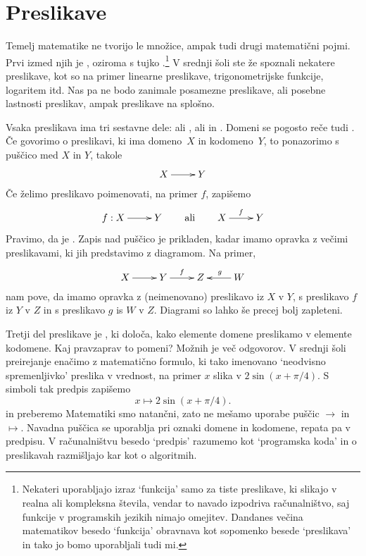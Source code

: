 \section{Preslikave}

Temelj matematike ne tvorijo le množice, ampak tudi drugi matematični pojmi. Prvi izmed
njih je , oziroma s tujko .\footnote{Nekateri uporabljajo
  izraz `funkcija' samo za tiste preslikave, ki slikajo v realna ali kompleksna števila,
  vendar to navado izpodriva računalništvo, saj funkcije v programskih jezikih nimajo
  omejitev. Dandanes večina matematikov besedo `funkcija' obravnava kot sopomenko besede
  `preslikava' in tako jo bomo uporabljali tudi mi.} V srednji šoli ste že spoznali
nekatere preslikave, kot so na primer linearne preslikave, trigonometrijske funkcije,
logaritem itd. Nas pa ne bodo zanimale posamezne preslikave, ali posebne lastnosti
preslikav, ampak preslikave na splošno.

Vsaka preslikava ima tri sestavne dele:  ali ,
 ali  in . Domeni se pogosto reče tudi
. Če govorimo o preslikavi, ki ima domeno~$X$ in kodomeno~$Y$, to
ponazorimo s puščico med $X$ in $Y$, takole
%
\begin{equation*}
  \xymatrix{
    {X} \ar[r] &
    {Y}
  }
\end{equation*}
%
Če želimo preslikavo poimenovati, na primer $f$, zapišemo
%
\begin{equation*}
  \xymatrix{
   {f : X} \ar[r] &
    {Y}
  }
  \qquad\text{ali}\qquad
  \xymatrix{
   {X} \ar[r]^{f} &
   {Y}
  }
\end{equation*}
%
Pravimo, da je . Zapis nad puščico je prikladen, kadar
imamo opravka z večimi preslikavami, ki jih predstavimo z diagramom. Na primer,
%
\begin{equation*}
  \xymatrix{
    {X} \ar[r] &
    {Y} \ar[r]^{f} &
    {Z}  &
    {W} \ar[l]_{g}
  }
\end{equation*}
%
nam pove, da imamo opravka z (neimenovano) preslikavo iz $X$ v $Y$, s preslikavo $f$ iz
$Y$ v $Z$ in s preslikavo $g$ is $W$ v $Z$. Diagrami so lahko še precej bolj zapleteni.

Tretji del preslikave je , ki določa, kako elemente domene preslikamo v elemente
kodomene. Kaj pravzaprav to pomeni? Možnih je več odgovorov. V srednji šoli preirejanje
enačimo z matematično formulo, ki tako imenovano `neodvisno spremenljivko' preslika v vrednost, na primer $x$ slika v
$2 \sin(x + \pi/4)$. S simboli tak predpis zapišemo
%
\begin{equation*}
  x \mapsto 2 \sin(x + \pi/4).
\end{equation*}
%
in preberemo 
%
Matematiki smo natančni, zato ne mešamo uporabe puščic $\to$ in $\mapsto$. Navadna puščica
se uporablja pri oznaki domene in kodomene, repata pa v predpisu. V računalništvu besedo
`predpis' razumemo kot `programska koda' in o preslikavah razmišljajo kar kot o
algoritmih.

